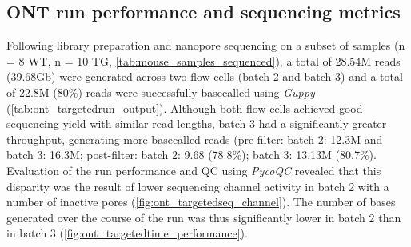 \newpage
\subsection{ONT run performance and sequencing metrics}
\label{ch6: ont_run_performance}
Following library preparation and nanopore sequencing on a subset of samples (n = 8 WT, n = 10 TG, \cref{tab:mouse_samples_sequenced}), a total of 28.54M reads (39.68Gb) were generated across two flow cells (batch 2 and batch 3) and a total of 22.8M (80\%) reads were successfully basecalled using \textit{Guppy} (\cref{tab:ont_targetedrun_output}). Although both flow cells achieved good sequencing yield with similar read lengths, batch 3 had a significantly greater throughput, generating more basecalled reads (pre-filter: batch 2: 12.3M and batch 3: 16.3M; post-filter: batch 2: 9.68 (78.8\%); batch 3: 13.13M (80.7\%). Evaluation of the run performance and QC using \textit{PycoQC} revealed that this disparity was the result of lower sequencing channel activity in batch 2 with a number of inactive pores (\cref{fig:ont_targetedseq_channel}). The number of bases generated over the course of the run was thus significantly lower in batch 2 than in batch 3 (\cref{fig:ont_targetedtime_performance}).  



